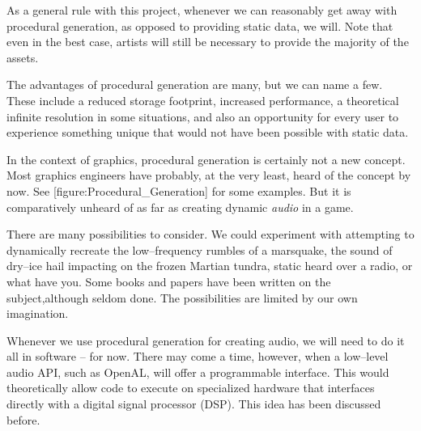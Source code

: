     {}
    {}
    {}
    {}
    {}
    {}
    {}
    \stopcombination

As a general rule with this project, whenever we can reasonably get away with procedural generation, as opposed to providing static data, we will. Note that even in the best case, artists will still be necessary to provide the majority of the assets.

The advantages of procedural generation are many, but we can name a few. These include a reduced storage footprint, increased performance, a theoretical infinite resolution in some situations, and also an opportunity for every user to experience something unique that would not have been possible with static data.

In the context of graphics, procedural generation is certainly not a new concept. Most graphics engineers have probably, at the very least, heard of the concept by now. See [figure:Procedural_Generation] for some examples. But it is comparatively unheard of as far as creating dynamic {\it audio} in a game. 

There are many possibilities to consider. We could experiment with attempting to dynamically recreate the low--frequency rumbles of a marsquake, the sound of dry--ice hail impacting on the frozen Martian tundra, static heard over a radio, or what have you. Some books and papers have been written on the subject, although seldom done. The possibilities are limited by our own imagination.

Whenever we use procedural generation for creating audio, we will need to do it all in software -- for now. There may come a time, however, when a low--level audio API, such as OpenAL, will offer a programmable  interface. This would theoretically allow code to execute on specialized hardware that interfaces directly with a digital signal processor (DSP). This idea has been discussed before.

